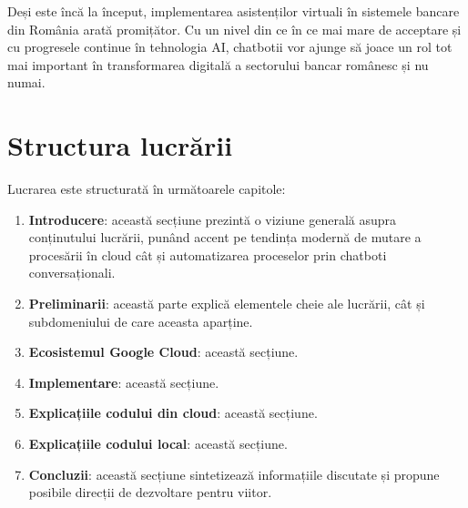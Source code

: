 Deși este încă la început, implementarea asistenților virtuali în sistemele bancare din România arată promițător. Cu un nivel din ce în ce mai mare de acceptare și cu progresele continue în tehnologia AI, chatbotii vor ajunge să joace un rol tot mai important în transformarea digitală a sectorului bancar românesc și nu numai.

\section{Structura lucrării}

Lucrarea este structurată în următoarele capitole:

\begin{enumerate}
    \item \textbf{Introducere}: această secțiune prezintă o viziune generală asupra conținutului lucrării, punând accent pe tendința modernă de mutare a procesării în cloud cât și automatizarea proceselor prin chatboti conversaționali.
    \item \textbf{Preliminarii}: această parte explică elementele cheie ale lucrării, cât și subdomeniului de care aceasta aparține.
    \item \textbf{Ecosistemul Google Cloud}: această secțiune.
    \item \textbf{Implementare}: această secțiune.
    \item \textbf{Explicațiile codului din cloud}: această secțiune.
    \item \textbf{Explicațiile codului local}: această secțiune.
    \item \textbf{Concluzii}: această secțiune sintetizează informațiile discutate și propune posibile direcții de dezvoltare pentru viitor.
\end{enumerate}